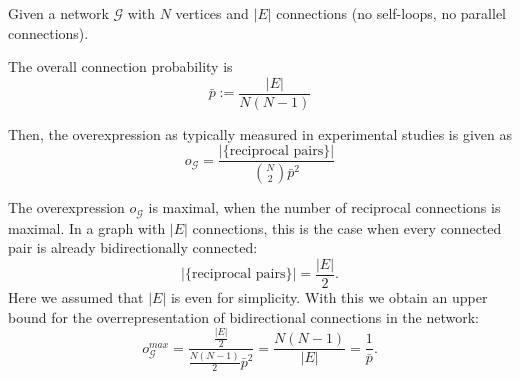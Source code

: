 
Given a network $\mathcal{G}$ with $N$ vertices and $|E|$ connections (no self-loops, no parallel connections).

The overall connection probability is
\[
\bar{p} := \frac{|E|}{N(N-1)}
\]

Then, the overexpression as typically measured in experimental studies is given as
\[
o_{\mathcal{G}} = \frac{|\{\textrm{reciprocal pairs}\}|}{\binom{N}{2} \bar{p}^2}
\]

The overexpression $o_{\mathcal{G}}$ is maximal, when the number of reciprocal connections is maximal. In a graph with $|E|$ connections, this is the case when every connected pair is already bidirectionally connected:
\[
|\{\textrm{reciprocal pairs}\}| = \frac{|E|}{2}.
\]
Here we assumed that $|E|$ is even for simplicity. With this we obtain an upper bound for the overrepresentation of bidirectional connections in the network:
%
\[
o_{\mathcal{G}}^{max} = \frac{\frac{|E|}{2}}{\frac{N(N-1)}{2} \bar{p}^2} = \frac{N(N-1)}{|E|} = \frac{1}{\bar{p}}.
\]

